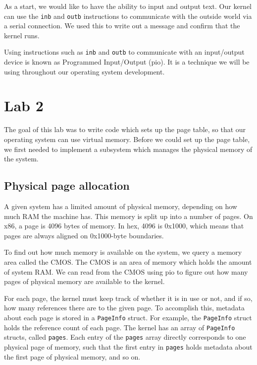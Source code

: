 \documentclass{article}
\begin{document}
As a start, we would like to have the ability to input and output text.
Our kernel can use the \texttt{inb} and \texttt{outb} instructions to
communicate with the outside world via a serial connection. We used this to
write out a message and confirm that the kernel runs.

Using instructions such as \texttt{inb} and \texttt{outb} to communicate with
an input/output device is known as Programmed Input/Output (\gls{pio}). It is a
technique we will be using throughout our operating system development.







\section{Lab 2}

The goal of this lab was to write code which sets up the page table, so that
our operating system can use virtual memory. Before we could set up the page
table, we first needed to implement a subsystem which manages the physical
memory of the system.

\subsection{Physical page allocation}
A given system has a limited amount of physical memory, depending on how much
RAM the machine has. This memory is split up into a number of pages. On x86, a
page is 4096 bytes of memory. In hex, 4096 is 0x1000, which means that pages
are always aligned on 0x1000-byte boundaries.

To find out how much memory is available on the system, we query a memory area
called the CMOS. The CMOS is an area of memory which holds the amount of
system RAM. We can read from the CMOS using \gls{pio} to figure out how many pages
of physical memory are available to the kernel.

For each page, the kernel must keep track of whether it is in use or not, and
if so, how many references there are to the given page. To accomplish this,
metadata about each page is stored in a \texttt{PageInfo} struct. For example,
the \texttt{PageInfo} struct holds the reference count of each page. The
kernel has an array of \texttt{PageInfo} structs, called \texttt{pages}.
Each entry of the \texttt{pages} array directly corresponds to one physical
page of memory, such that the first entry in \texttt{pages} holds metadata
about the first page of physical memory, and so on.
\end{document}
